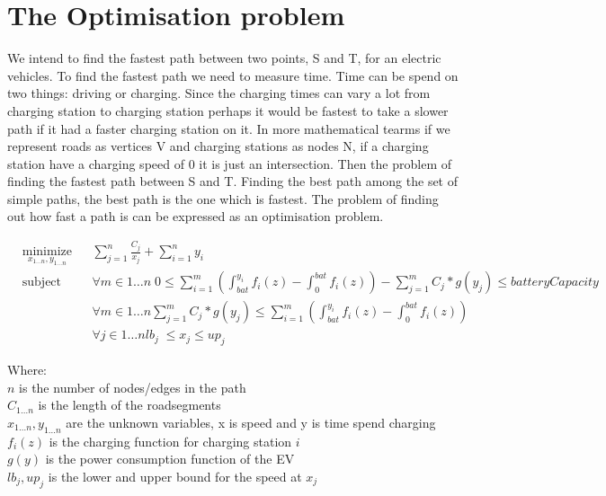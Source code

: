 \section{The Optimisation problem}

We intend to find the fastest path between two points, S and T, for an electric vehicles. To find the fastest path we need to measure time. Time can be spend on two things: driving or charging. Since the charging times can vary a lot from charging station to charging station perhaps it would be fastest to take a slower path if it had a faster charging station on it. In more mathematical tearms if we represent roads as vertices V and charging stations as nodes N, if a charging station have a charging speed of 0 it is just an intersection. Then the problem of finding the fastest path between S and T. Finding the best path among the set of simple paths, the best path is the one which is fastest. The problem of finding out how fast a path is can be expressed as an optimisation problem. 

\begin{equation}
\begin{aligned}
& \underset{x_{1 \dots n},y_{1 \dots n}}{\text{minimize}} & & \sum_{j=1}^{n} \frac{C_j}{x_j} + \sum_{i=1}^{n} y_i \\
& \text{subject to} 
& & \forall{m \in 1 \dots n} \; 0 \leq \sum_{i=1}^{m} \left( \int_{bat}^{y_i} f_i(z) - \int_{0}^{bat} f_i(z)\right) - \sum_{j=1}^{m} C_j*g(y_j) \leq batteryCapacity \\
&&& \forall{m \in 1 \dots n} \sum_{j=1}^{m} C_j*g(y_j) \leq \sum_{i=1}^{m} \left( \int_{bat}^{y_i} f_i(z) - \int_{0}^{bat} f_i(z)\right) \\
&&& \forall{j \in 1 \dots n} lb_j \; \leq x_j \leq up_j
\end{aligned}
\end{equation}

Where: \\
$n$ is the number of nodes/edges in the path \\
$C_{1 \dots n}$ is the length of the roadsegments \\
$x_{1 \dots n}, y_{1 \dots n}$ are the unknown variables, x is speed and y is time spend charging \\
$f_{i}(z)$ is the charging function for charging station $i$ \\
$g(y)$ is the power consumption function of the EV \\
$lb_j, up_j$ is the lower and upper bound for the speed at $x_j$  \\



